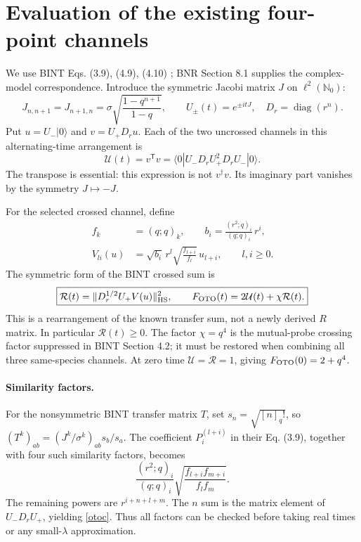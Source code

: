 \documentclass[11pt,a4paper]{article}
\begin{document}
\newpage
\section{Evaluation of the existing four-point channels}
We use BINT Eqs. (3.9), (4.9), (4.10) \cite{bint}; BNR Section 8.1
\cite{bnr} supplies the complex-model correspondence. Introduce the
symmetric Jacobi matrix $J$ on $\ell^2(\mathbb N_0)$:
\begin{equation}
 J_{n,n+1}=J_{n+1,n}=\sigma\sqrt{\frac{1-q^{n+1}}{1-q}},
 \qquad U_\pm(t)=e^{\pm itJ},\quad D_r=\operatorname{diag}(r^n).
\end{equation}
Put $u=U_-|0\rangle$ and $v=U_+D_ru$. Each of the two uncrossed
channels in this alternating-time arrangement is
\begin{equation}
 \mathcal U(t)=v^{\mathsf T}v
 =\langle0|U_-D_rU_+^2D_rU_-|0\rangle.\label{unc}
\end{equation}
The transpose is essential: this expression is not $v^\dagger v$.
Its imaginary part vanishes by the symmetry $J\mapsto-J$.

For the selected crossed channel, define
\begin{align}
 f_k&=(q;q)_k,\qquad
 b_i=\frac{(r^2;q)_i}{(q;q)_i}\,r^i,\\
 V_{li}(u)&=\sqrt{b_i}\,r^l\sqrt{\frac{f_{l+i}}{f_l}}\,u_{l+i},
 \qquad l,i\ge0 .
\end{align}
The symmetric form of the BINT crossed sum is
\begin{equation}\boxed{
 \mathcal R(t)=\|D_r^{1/2}U_+V(u)\|_{\rm HS}^2,\qquad
 F_{\rm OTO}(t)=2\mathcal U(t)+\chi\mathcal R(t).}\label{otoc}
\end{equation}
This is a rearrangement of the known transfer sum, not a newly derived
$R$ matrix. In particular $\mathcal R(t)\ge0$. The factor $\chi=q^4$
is the mutual-probe crossing factor suppressed in BINT Section 4.2;
it must be restored when combining all three same-species channels.
At zero time $\mathcal U=\mathcal R=1$, giving $F_{\rm OTO}(0)=2+q^4$.

\paragraph{Similarity factors.}
For the nonsymmetric BINT transfer matrix $T$, set
$s_n=\sqrt{[n]_q!}$, so $(T^k)_{ab}=(J^k/\sigma^k)_{ab}s_b/s_a$.
The coefficient $P_i^{(l+i)}$ in their Eq. (3.9), together with four
such similarity factors, becomes
\begin{equation}
 \frac{(r^2;q)_i}{(q;q)_i}
 \sqrt{\frac{f_{l+i}f_{m+i}}{f_lf_m}}.
\end{equation}
The remaining powers are $r^{i+n+l+m}$. The $n$ sum is the matrix
element of $U_-D_rU_+$, yielding \eqref{otoc}. Thus all factors can be
checked before taking real times or any small-$\lambda$ approximation.
\end{document}
